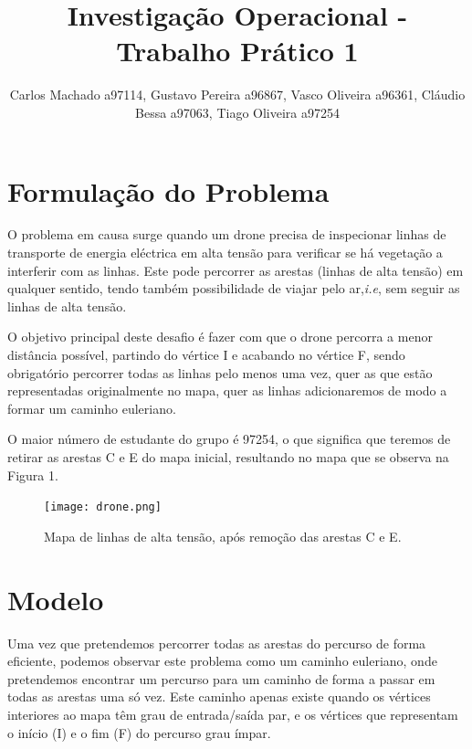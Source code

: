 \documentclass[runningheads]{llncs}
\begin{document}
%
    \title{Investigação Operacional - Trabalho Prático 1}
    \author{Carlos Machado a97114, Gustavo Pereira a96867,
        Vasco Oliveira a96361, Cláudio Bessa a97063, Tiago Oliveira a97254}





    \maketitle
    \newpage
    \section{Formulação do Problema}


    O problema em causa surge quando um drone precisa de inspecionar linhas de transporte de energia eléctrica em alta tensão para verificar se há vegetação a interferir com as linhas. Este pode percorrer as arestas (linhas de alta tensão) em qualquer sentido, tendo também possibilidade de viajar pelo ar,\textit{i.e}, sem seguir as linhas de alta tensão.

    O objetivo principal deste desafio é fazer com que o drone percorra a menor distância possível, partindo do vértice I e acabando no vértice F, sendo obrigatório percorrer todas as linhas pelo menos uma vez, quer as que estão representadas originalmente no mapa, quer as linhas adicionaremos de modo a formar um caminho euleriano.

    O maior número de estudante do grupo é 97254, o que significa que teremos de retirar as arestas C e E do mapa inicial, resultando no mapa que se observa na Figura 1.

    \begin{figure}[h]
        \centering
        \texttt{[image: drone.png]}
        \caption{Mapa de linhas de alta tensão, após remoção das arestas C e E.}
        \label{fig:data1}
    \end{figure}

    \newpage

    \section{Modelo}
    Uma vez que pretendemos percorrer todas as arestas do percurso de forma eficiente, podemos observar este problema como um caminho euleriano, onde pretendemos encontrar um percurso para um caminho de forma a passar em todas as arestas uma só vez. Este caminho apenas existe quando os vértices interiores ao mapa têm grau de entrada/saída par, e os vértices que representam o início (I) e o fim (F) do percurso grau ímpar.
\end{document}
